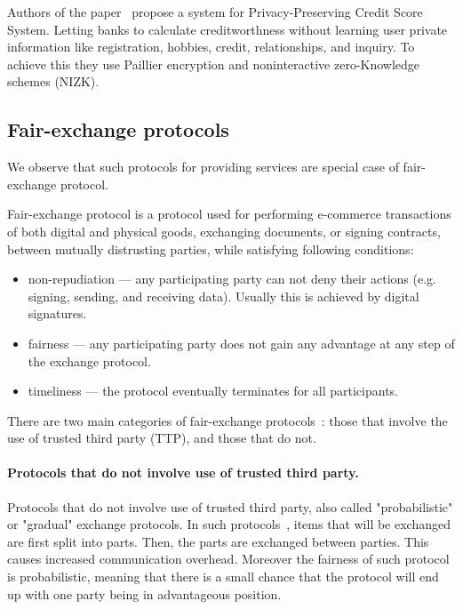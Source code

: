 \documentclass{article}
\begin{document}
Authors of the paper~\cite{lin2021efficient} propose a system for Privacy-Preserving Credit Score System. Letting banks to calculate creditworthness without learning user private information like registration, hobbies, credit, relationships, and inquiry. To achieve this they use Paillier encryption and noninteractive zero-Knowledge schemes (NIZK).

\subsection{Fair-exchange protocols}

We observe that such protocols for providing services are special case of fair-exchange protocol.

Fair-exchange protocol is a protocol used for performing e-commerce transactions of both digital and physical goods, exchanging documents, or signing contracts, between mutually distrusting parties, while satisfying following conditions:
\begin{itemize}
    \item non-repudiation  — any participating party can not deny their actions (e.g. signing, sending, and receiving data). Usually this is achieved by digital signatures.
    \item fairness — any participating party does not gain any advantage at any step of the exchange protocol.
    \item timeliness — the protocol eventually terminates for all participants.
\end{itemize}

There are two main categories of fair-exchange protocols~\cite{kremer2002intensive,duangphasuk2020fair}: those that involve the use of trusted third party (TTP), and those that do not.

\paragraph{Protocols that do not involve use of trusted third party.}
Protocols that do not involve use of trusted third party, also called "probabilistic" or "gradual" exchange protocols. In such protocols~\cite{markowitch1999probabilistic}, items that will be exchanged are first split into parts. Then, the parts are exchanged between parties. This causes increased communication overhead. Moreover the fairness of such protocol is probabilistic, meaning that there is a small chance that the protocol will end up with one party being in advantageous position. 
\end{document}
